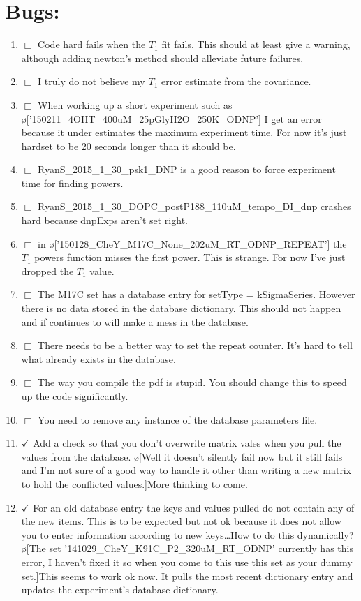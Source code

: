 \documentclass[10pt]{book}
\begin{document}
\section{Bugs:}
\begin{enumerate}
    \item $\Box$ Code hard fails when the $T_1$ fit fails. This should at least give a warning, although adding newton's method should alleviate future failures.
    \item $\Box$ I truly do not believe my $T_1$ error estimate from the covariance.
    \item $\Box$ When working up a short experiment such as \o['150211_4OHT_400uM_25pGlyH2O_250K_ODNP']{} I get an error because it under estimates the maximum experiment time. For now it's just hardset to be 20 seconds longer than it should be.
    \item $\Box$ RyanS_2015_1_30_psk1_DNP is a good reason to force experiment time for finding powers.
    \item $\Box$ RyanS_2015_1_30_DOPC_postP188_110uM_tempo_DI_dnp crashes hard because dnpExps aren't set right. 
    \item $\Box$ in \o['150128_CheY_M17C_None_202uM_RT_ODNP_REPEAT']{} the $T_1$ powers function misses the first power. This is strange. For now I've just dropped the $T_1$ value.
    \item $\Box$ The M17C set has a database entry for setType = kSigmaSeries. However there is no data stored in the database dictionary. This should not happen and if continues to will make a mess in the database.
    \item $\Box$ There needs to be a better way to set the repeat counter. It's hard to tell what already exists in the database.
    \item $\Box$ The way you compile the pdf is stupid. You should change this to speed up the code significantly.
    \item $\Box$ You need to remove any instance of the database parameters file.
    \item $\checkmark$ Add a check so that you don't overwrite matrix vales when you pull the values from the database. \o[Well it doesn't silently fail now but it still fails and I'm not sure of a good way to handle it other than writing a new matrix to hold the conflicted values.]{More thinking to come.}
    \item $\checkmark$ For an old database entry the keys and values pulled do not contain any of the new items. This is to be expected but not ok because it does not allow you to enter information according to new keys\ldots How to do this dynamically? \o[The set '141029_CheY_K91C_P2_320uM_RT_ODNP' currently has this error, I haven't fixed it so when you come to this use this set as your dummy set.]{This seems to work ok now. It pulls the most recent dictionary entry and updates the experiment's database dictionary.}

\end{enumerate}
\end{document}
